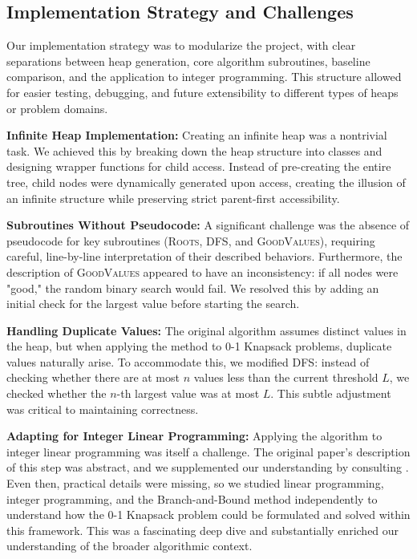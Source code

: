 \documentclass[conference]{IEEEtran}
\begin{document}
\subsection*{Implementation Strategy and Challenges}

Our implementation strategy was to modularize the project, with clear separations between heap generation, core algorithm subroutines, baseline comparison, and the application to integer programming. This structure allowed for easier testing, debugging, and future extensibility to different types of heaps or problem domains.

\textbf{Infinite Heap Implementation:}  
Creating an infinite heap was a nontrivial task. We achieved this by breaking down the heap structure into classes and designing wrapper functions for child access. Instead of pre-creating the entire tree, child nodes were dynamically generated upon access, creating the illusion of an infinite structure while preserving strict parent-first accessibility.

\textbf{Subroutines Without Pseudocode:}  
A significant challenge was the absence of pseudocode for key subroutines (\textsc{Roots}, \textsc{DFS}, and \textsc{GoodValues}), requiring careful, line-by-line interpretation of their described behaviors. Furthermore, the description of \textsc{GoodValues} appeared to have an inconsistency: if all nodes were "good," the random binary search would fail. We resolved this by adding an initial check for the largest value before starting the search.

\textbf{Handling Duplicate Values:}  
The original algorithm assumes distinct values in the heap, but when applying the method to 0-1 Knapsack problems, duplicate values naturally arise. To accommodate this, we modified \textsc{DFS}: instead of checking whether there are at most $n$ values less than the current threshold $L$, we checked whether the $n$-th largest value was at most $L$. This subtle adjustment was critical to maintaining correctness.

\textbf{Adapting for Integer Linear Programming:}  
Applying the algorithm to integer linear programming was itself a challenge. The original paper’s description of this step was abstract, and we supplemented our understanding by consulting \cite{karp1986search}. Even then, practical details were missing, so we studied linear programming, integer programming, and the Branch-and-Bound method independently to understand how the 0-1 Knapsack problem could be formulated and solved within this framework. This was a fascinating deep dive and substantially enriched our understanding of the broader algorithmic context.
\end{document}
